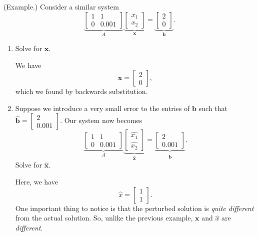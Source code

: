 \documentclass[letterpaper]{article}
\newcommand{\0}{\mathbf{0}}
\renewcommand{\b}{\mathbf{b}}
\newcommand{\x}{\mathbf{x}}
\begin{document}
\begin{mdframed}[nobreak=true]
    (Example.) Consider a similar system 
    \[\underbrace{\begin{bmatrix}
        1 & 1 \\ 0 & 0.001 
    \end{bmatrix}}_A \underbrace{\begin{bmatrix}
        x_1 \\ x_2
    \end{bmatrix}}_{\x} = \underbrace{\begin{bmatrix}
        2 \\ 0
    \end{bmatrix}}_{\b}.\]

    \begin{enumerate}
        \item Solve for $\x$. 
        \begin{mdframed}
            We have 
            \[\x = \begin{bmatrix}
                2 \\ 0
            \end{bmatrix},\] which we found by backwards substitution. 
        \end{mdframed}

        \item Suppose we introduce a very small error to the entries of $\b$ such that $\hat{\b} = \begin{bmatrix}
            2 \\ 0.001
        \end{bmatrix}.$ Our system now becomes \[\underbrace{\begin{bmatrix}
            1 & 1 \\ 0 & 0.001 
        \end{bmatrix}}_A \underbrace{\begin{bmatrix}
            \hat{x_1} \\ \hat{x_2}
        \end{bmatrix}}_{\hat{\x}} = \underbrace{\begin{bmatrix}
            2 \\ 0.001
        \end{bmatrix}}_{\hat{\b}}.\] Solve for $\hat{\x}$.

        \begin{mdframed}
            Here, we have \[\hat{x} = \begin{bmatrix}
                1 \\ 1
            \end{bmatrix}.\]
            One important thing to notice is that the perturbed solution is \emph{quite different} from the actual solution. So, unlike the previous example, $\x$ and $\hat{x}$ are \emph{different}. 
        \end{mdframed}


\end{enumerate}
\end{mdframed}
\end{document}
